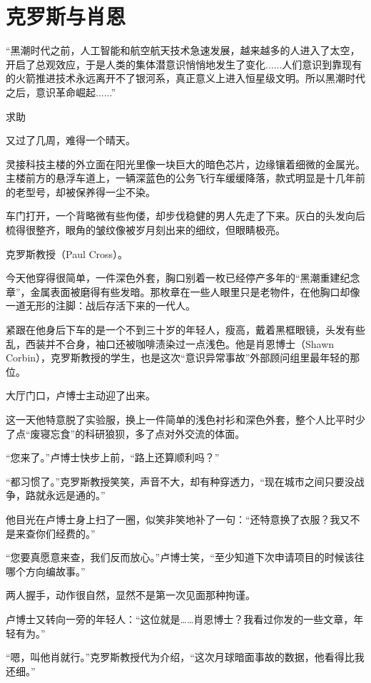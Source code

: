 \chapter{克罗斯与肖恩}

“黑潮时代之前，人工智能和航空航天技术急速发展，越来越多的人进入了太空，开启了总观效应，于是人类的集体潜意识悄悄地发生了变化......人们意识到靠现有的火箭推进技术永远离开不了银河系，真正意义上进入恒星级文明。所以黑潮时代之后，意识革命崛起......”

求助

又过了几周，难得一个晴天。

灵接科技主楼的外立面在阳光里像一块巨大的暗色芯片，边缘镶着细微的金属光。主楼前方的悬浮车道上，一辆深蓝色的公务飞行车缓缓降落，款式明显是十几年前的老型号，却被保养得一尘不染。

车门打开，一个背略微有些佝偻，却步伐稳健的男人先走了下来。灰白的头发向后梳得很整齐，眼角的皱纹像被岁月刻出来的细纹，但眼睛极亮。

克罗斯教授（Paul Cross）。

今天他穿得很简单，一件深色外套，胸口别着一枚已经停产多年的“黑潮重建纪念章”，金属表面被磨得有些发暗。那枚章在一些人眼里只是老物件，在他胸口却像一道无形的注脚：战后存活下来的一代人。

紧跟在他身后下车的是一个不到三十岁的年轻人，瘦高，戴着黑框眼镜，头发有些乱，西装并不合身，袖口还被咖啡渍染过一点浅色。他是肖恩博士（Shawn Corbin），克罗斯教授的学生，也是这次“意识异常事故”外部顾问组里最年轻的那位。

大厅门口，卢博士主动迎了出来。

这一天他特意脱了实验服，换上一件简单的浅色衬衫和深色外套，整个人比平时少了点“废寝忘食”的科研狼狈，多了点对外交流的体面。

“您来了。”卢博士快步上前，“路上还算顺利吗？”

“都习惯了。”克罗斯教授笑笑，声音不大，却有种穿透力，“现在城市之间只要没战争，路就永远是通的。”

他目光在卢博士身上扫了一圈，似笑非笑地补了一句：“还特意换了衣服？我又不是来查你们经费的。”

“您要真愿意来查，我们反而放心。”卢博士笑，“至少知道下次申请项目的时候该往哪个方向编故事。”

两人握手，动作很自然，显然不是第一次见面那种拘谨。

卢博士又转向一旁的年轻人：“这位就是……肖恩博士？我看过你发的一些文章，年轻有为。”

“嗯，叫他肖就行。”克罗斯教授代为介绍，“这次月球暗面事故的数据，他看得比我还细。”

